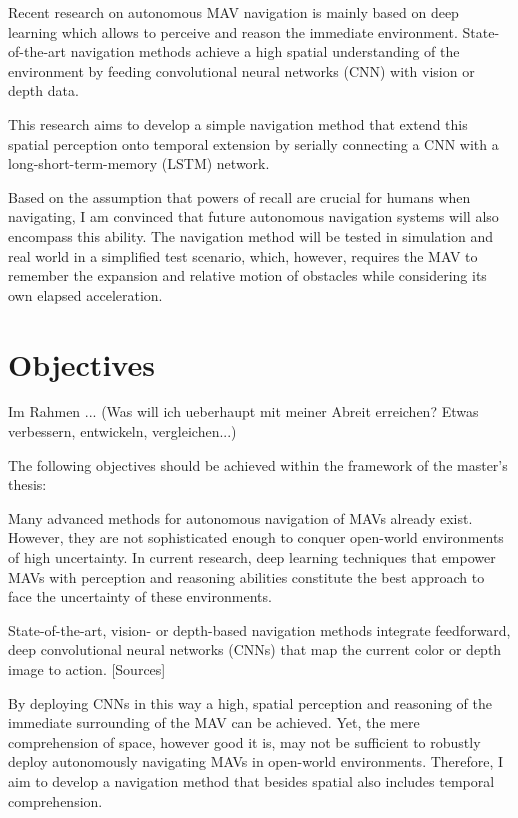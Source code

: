 Recent research on autonomous MAV navigation is mainly based on deep learning 
which allows to perceive and reason the immediate environment.
State-of-the-art navigation methods achieve a high spatial understanding of the environment
by feeding convolutional neural networks (CNN) with vision or depth data.

This research aims to develop a simple navigation method 
that extend this spatial perception onto temporal extension 
by serially connecting a CNN with a long-short-term-memory (LSTM) network.

Based on the assumption that powers of recall are crucial for humans when navigating,
I am convinced that future autonomous navigation systems will also encompass this ability.
The navigation method will be tested in simulation and real world in a simplified test scenario,
which, however, requires the MAV to remember the expansion and relative motion of obstacles while considering its own elapsed acceleration.




\chapter{Objectives}
Im Rahmen ... (Was will ich ueberhaupt mit meiner Abreit erreichen? Etwas verbessern, entwickeln, vergleichen...)

 
The following objectives should be achieved within the framework of the master's thesis:



Many advanced methods for autonomous navigation of MAVs already exist.
However, they are not sophisticated enough to conquer open-world environments of high uncertainty.
In current research, deep learning techniques
that empower MAVs with perception and reasoning abilities
constitute the best approach to face the uncertainty of these environments.


State-of-the-art, vision- or depth-based navigation methods 
integrate feedforward, deep convolutional neural networks (CNNs)
that map the current color or depth image to action. [Sources]

By deploying CNNs in this way a high, spatial perception and reasoning 
of the immediate surrounding of the MAV can be achieved.
Yet, the mere comprehension of space, however good it is,
may not be sufficient to robustly deploy autonomously navigating MAVs in 
open-world environments.
Therefore, I aim to develop a navigation method that besides spatial
also includes temporal comprehension.


